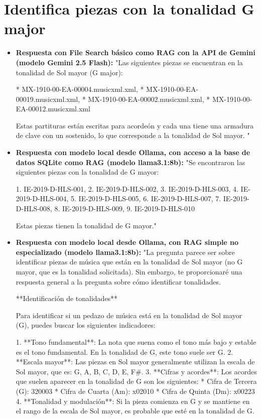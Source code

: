 \section{Identifica piezas con la tonalidad G major}
\begin{itemize}
    \item \textbf{Respuesta con File Search básico como RAG con la API de Gemini (modelo Gemini 2.5 Flash):} "Las siguientes piezas se encuentran en la tonalidad de Sol mayor (G major):

*   MX-1910-00-EA-00004.musicxml.xml,
*   MX-1910-00-EA-00019.musicxml.xml,
*   MX-1910-00-EA-00002.musicxml.xml,
*   MX-1910-00-EA-00012.musicxml.xml

Estas partituras están escritas para acordeón y cada una tiene una armadura de clave con un sostenido, lo que corresponde a la tonalidad de Sol mayor.
"
    \item \textbf{Respuesta con modelo local desde Ollama, con acceso a la base de datos SQLite como RAG (modelo llama3.1:8b):} "Se encontraron las siguientes piezas con la tonalidad de G mayor:

1. IE-2019-D-HLS-001,
2. IE-2019-D-HLS-002,
3. IE-2019-D-HLS-003,
4. IE-2019-D-HLS-004,
5. IE-2019-D-HLS-005,
6. IE-2019-D-HLS-007,
7. IE-2019-D-HLS-008,
8. IE-2019-D-HLS-009,
9. IE-2019-D-HLS-010

Estas piezas tienen la tonalidad de G mayor."
    \item \textbf{Respuesta con modelo local desde Ollama, con RAG simple no especializado (modelo llama3.1:8b):} "La pregunta parece ser sobre identificar piezas de música que están en la tonalidad de Sol mayor (no G mayor, que es la tonalidad solicitada). Sin embargo, te proporcionaré una respuesta general a la pregunta sobre cómo identificar tonalidades.

**Identificación de tonalidades**

Para identificar si un pedazo de música está en la tonalidad de Sol mayor (G), puedes buscar los siguientes indicadores:

1. **Tono fundamental**: La nota que suena como el tono más bajo y estable es el tono fundamental. En la tonalidad de G, este tono suele ser G.
2. **Escala mayor**: Las piezas en Sol mayor generalmente utilizan la escala de Sol mayor, que es: G, A, B, C, D, E, F\#.
3. **Cifras y acordes**: Los acordes que suelen aparecer en la tonalidad de G son los siguientes: 
 * Cifra de Tercera (G): 320003
 * Cifra de Cuarta (Am): x02010
 * Cifra de Quinta (Dm): x00223
4. **Tonalidad y modulación**: Si la pieza comienza en G y se mantiene en el rango de la escala de Sol mayor, es probable que esté en la tonalidad de G.


\end{itemize}

